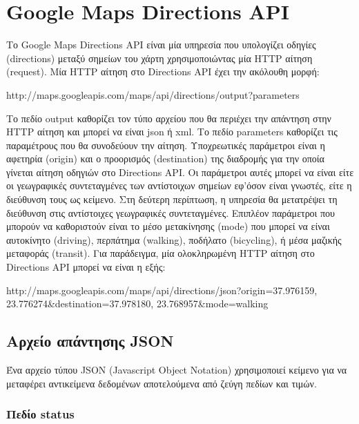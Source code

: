 \section{Google Maps Directions API}

Το Google Maps Directions API είναι μία υπηρεσία που υπολογίζει οδηγίες (directions) μεταξύ σημείων του χάρτη χρησιμοποιώντας μία HTTP αίτηση (request). 
Μία HTTP αίτηση στο Directions API έχει την ακόλουθη μορφή:
\begin{center}
  http://maps.googleapis.com/maps/api/directions/output?parameters
\end{center}
Το πεδίο output καθορίζει τον τύπο αρχείου που θα περιέχει την απάντηση στην HTTP αίτηση και μπορεί να είναι json ή xml. Το πεδίο parameters καθορίζει τις 
παραμέτρους που θα συνοδεύουν την αίτηση. Υποχρεωτικές παράμετροι είναι η αφετηρία (origin) και ο προορισμός (destination) της διαδρομής για την οποία γίνεται αίτηση 
οδηγιών στο Directions API. Οι παράμετροι αυτές μπορεί να είναι είτε οι γεωγραφικές συντεταγμένες των αντίστοιχων σημείων εφ'όσον είναι γνωστές, είτε η διεύθυνση τους 
ως κείμενο. Στη δεύτερη περίπτωση, η υπηρεσία θα μετατρέψει τη διεύθυνση στις αντίστοιχες γεωγραφικές συντεταγμένες. Επιπλέον παράμετροι που μπορούν να καθοριστούν 
είναι το μέσο μετακίνησης (mode) που μπορεί να είναι αυτοκίνητο (driving), περπάτημα (walking), ποδήλατο (bicycling), ή μέσα μαζικής μεταφοράς (transit). Για παράδειγμα, 
μία ολοκληρωμένη HTTP αίτηση στο Directions API μπορεί να είναι η εξής:
\begin{center}
 http://maps.googleapis.com/maps/api/directions/json?origin=37.976159, 23.776274\&destination=37.978180, 23.768957\&mode=walking
\end{center}

\subsection{Αρχείο απάντησης JSON}

Ένα αρχείο τύπου JSON (Javascript Object Notation) χρησιμοποιεί κείμενο για να μεταφέρει αντικείμενα δεδομένων αποτελούμενα από ζεύγη πεδίων και τιμών. 

\subsubsection{Πεδίο status}

